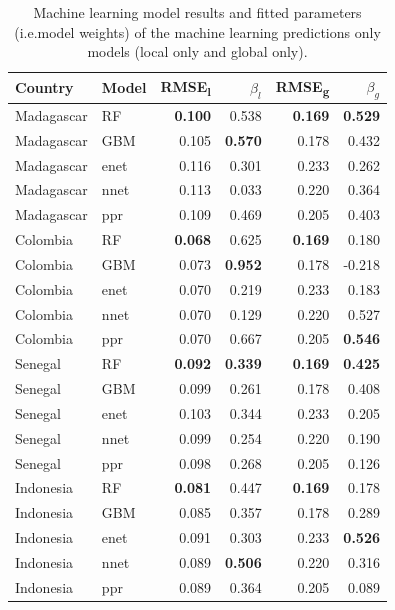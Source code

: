 \documentclass[review]{elsarticle}
\begin{document}
\begin{table}[t!]
\caption{Machine learning model results and fitted parameters (i.e.\thinspace model weights) of the machine learning predictions only models (local only and global only). }
\centering
\small
\begin{tabular}{ll|rr|rr}
     Country          & Model &      RMSE\textsubscript{l} & $\beta_l$ & RMSE\textsubscript{g} & $\beta_g$ \\ \hline
Madagascar & RF & \textbf{0.100} & 0.538 &  \textbf{0.169} & \textbf{0.529}\\
Madagascar & GBM & 0.105 & \textbf{0.570} & 0.178& 0.432 \\
Madagascar & enet & 0.116 & 0.301 &0.233 & 0.262 \\
Madagascar & nnet & 0.113 & 0.033 &0.220 & 0.364 \\
Madagascar & ppr & 0.109 & 0.469 & 0.205 &  0.403\vspace{0.3cm}\\ 
Colombia & RF & \textbf{0.068} & 0.625 &  \textbf{0.169} & 0.180\\
Colombia & GBM & 0.073 & \textbf{0.952} & 0.178& -0.218  \\
Colombia & enet & 0.070 & 0.219 &0.233 & 0.183 \\
Colombia & nnet & 0.070 & 0.129 &0.220 & 0.527 \\
Colombia & ppr & 0.070 & 0.667 & 0.205 &  \textbf{0.546}\vspace{0.3cm}\\
Senegal & RF & \textbf{0.092} & \textbf{0.339} & \textbf{0.169} & \textbf{0.425} \\
Senegal & GBM & 0.099 & 0.261& 0.178& 0.408 \\
Senegal & enet& 0.103 & 0.344  &0.233 & 0.205 \\
Senegal & nnet & 0.099 & 0.254 &0.220 & 0.190 \\
Senegal & ppr & 0.098 & 0.268& 0.205 &  0.126\vspace{0.3cm}\\
Indonesia & RF& \textbf{0.081} & 0.447 & \textbf{0.169} & 0.178\\
Indonesia & GBM & 0.085 & 0.357 & 0.178& 0.289 \\
Indonesia & enet & 0.091 & 0.303 &0.233 & \textbf{0.526} \\
Indonesia & nnet & 0.089 & \textbf{0.506} &0.220 & 0.316 \\
Indonesia & ppr & 0.089 & 0.364 & 0.205 &  0.089\vspace{0.3cm}\\

\end{tabular}
\label{t:mlresults}
\end{table}
\end{document}
